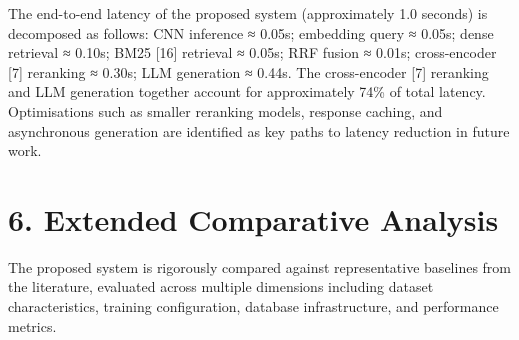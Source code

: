 The end-to-end latency of the proposed system (approximately 1.0
seconds) is decomposed as follows: CNN inference ≈ 0.05s; embedding
query ≈ 0.05s; dense retrieval ≈ 0.10s; BM25 {[}16{]} retrieval ≈ 0.05s;
RRF fusion ≈ 0.01s; cross-encoder {[}7{]} reranking ≈ 0.30s; LLM
generation ≈ 0.44s. The cross-encoder {[}7{]} reranking and LLM
generation together account for approximately 74\% of total latency.
Optimisations such as smaller reranking models, response caching, and
asynchronous generation are identified as key paths to latency reduction
in future work.

\section*{6. Extended Comparative
Analysis}\label{extended-comparative-analysis}

The proposed system is rigorously compared against representative
baselines from the literature, evaluated across multiple dimensions
including dataset characteristics, training configuration, database
infrastructure, and performance metrics.

